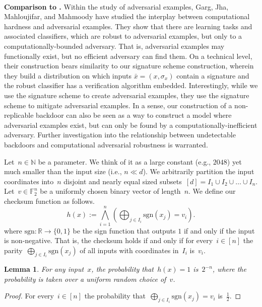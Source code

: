 \documentclass[preprint,11pt]{elsarticle}
\newtheorem{lemma}[theorem]{Lemma}
\newcommand{\R}{\mathbb{R}} %
\newcommand{\N}{\mathbb{N}}
\begin{document}
\paragraph{}
\textbf{Comparison to \cite{garg2020adversarially}.}
Within the study of adversarial examples, Garg, Jha, Mahloujifar, and Mahmoody \cite{garg2020adversarially} have studied the interplay between computational hardness and adversarial examples.
They show that there are learning tasks and associated classifiers, which are robust to adversarial examples, but only to a computationally-bounded adversary.
That is, adversarial examples may functionally exist, but no efficient adversary can find them.
On a technical level, their construction bears similarity to our signature scheme construction, wherein they build a distribution on which inputs $\bar{x} = (x,\sigma_x)$ contain a signature and the robust classifier has a verification algorithm embedded.
Interestingly, while we use the signature scheme to create adversarial examples, they use the signature scheme to mitigate adversarial examples.
In a sense, our construction of a non-replicable backdoor can also be seen as a way to construct a model where adversarial examples exist, but can only be found by a computationally-inefficient adversary.
Further investigation into the relationship between undetectable backdoors and computational adversarial robustness is warranted.

\newpage


Let~$n\in \N$ be a parameter. We think of it as a large constant (e.g., $2048$) yet much smaller than the input size (i.e., $n\ll d$). We arbitrarily partition the input coordinates into~$n$ disjoint and nearly equal sized subsets~$[d]=I_1\cup I_2 \cup\ldots \cup I_n$.
Let~$v\in \mathbb{F}_2^n$ be a uniformly chosen binary vector of length~$n$. 
We define our checksum function as follows.
\[
h({x}) := \bigwedge_{i=1}^{n}\left(\bigoplus_{j\in I_i} \text{sgn}(x_{j}) = v_i\right).
\]
where $\text{sgn}:\R \to \{0,1\}$ be the sign function that outputs $1$ if and only if the input is non-negative.
That is, the checksum holds if and only if for every~$i\in [n]$ the parity~$\bigoplus_{j\in I_i} \text{sgn}(x_{j})$ of all inputs with coordinates in~$I_i$ is~$v_i$.

\begin{lemma}
For any input~${x}$, the probability that~$h({x})=1$ is~$2^{-n}$, where the probability is taken over a uniform random choice of~$v$.
\end{lemma}
\begin{proof}
  For every~$i\in[n]$ the probability that~$\bigoplus_{j\in I_i} \text{sgn}(x_{j}) = v_i$ is~$\frac{1}{2}$.
\end{proof}
\end{document}
